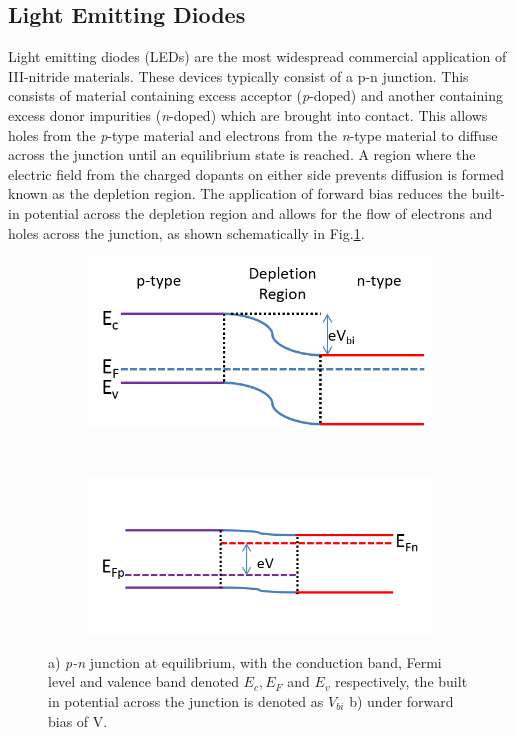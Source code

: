 \subsection{Light Emitting Diodes}
Light emitting diodes (LEDs) are the most widespread commercial application of III-nitride materials. These devices typically consist of a {p-n} junction. This consists of material containing excess acceptor ({\it p}-doped) and another containing excess donor impurities ({\it n}-doped) which are brought into contact. This allows holes from the {\it p}-type material and electrons from the {\it n}-type material to diffuse across the junction until an equilibrium state is reached. A region where the electric field from the charged dopants on either side prevents diffusion is formed known as the depletion region. The application of forward bias reduces the built-in potential across the depletion region and allows for the flow of electrons and holes across the junction, as shown schematically in Fig.\ref{1.10}.
\begin{figure}[h]
		\hspace*{1cm}
	\begin{subfigure}[t]{0.4\textwidth}
		\centering
		\includegraphics[width = 1\textwidth]{Figs/Ch1/pn1.png}
		\caption{}
	\end{subfigure}%
	\hspace*{1cm}
	~	
	\begin{subfigure}[t]{0.4\textwidth}
		\centering
		\includegraphics[width=1\textwidth]{Figs/Ch1/pn2.png}
		\caption{}
	\end{subfigure}
	\caption {a) {\it p-n} junction at equilibrium, with the conduction band, Fermi level and valence band denoted $E_{c},E_{F}$ and $E_{v}$ respectively, the built in potential across the junction is denoted as $V_{bi}$ b) under forward bias of V.}
	\label{1.10}
\end{figure}
\FloatBarrier

